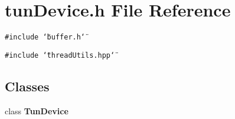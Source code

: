 \section{tun\-Device.h File Reference}
\label{tunDevice_8h}
{\tt \#include \char`\"{}buffer.h\char`\"{}}\par
{\tt \#include \char`\"{}thread\-Utils.hpp\char`\"{}}\par
\subsection*{Classes}
\begin{CompactItemize}
\item 
class {\bf Tun\-Device}
\end{CompactItemize}

